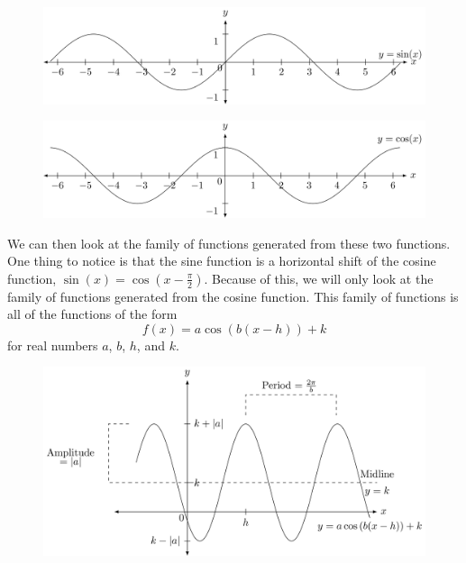 \documentclass[
]{book}
\theoremstyle{definition}
\theoremstyle{definition}
\theoremstyle{definition}
\theoremstyle{definition}
\theoremstyle{remark}
\begin{document}
\begin{figure}

{\centering \includegraphics[width=1\linewidth]{tikz/sine-graph} 

}

\end{figure}

\begin{figure}

{\centering \includegraphics[width=1\linewidth]{tikz/cosine-graph} 

}

\end{figure}

We can then look at the family of functions generated from these two functions. One thing to notice is that the sine function is a horizontal shift of the cosine function, \(\sin(x)=\cos\left(x-\frac{\pi}{2}\right)\). Because of this, we will only look at the family of functions generated from the cosine function. This family of functions is all of the functions of the form
\[f(x)=a \cos\left(b(x-h)\right) +k\]
for real numbers \(a\), \(b\), \(h\), and \(k\).

\begin{figure}

{\centering \includegraphics[width=1\linewidth]{tikz/cosine-graph2} 

}

\end{figure}
\end{document}
